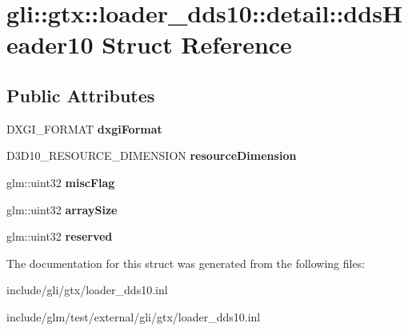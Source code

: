 \hypertarget{structgli_1_1gtx_1_1loader__dds10_1_1detail_1_1ddsHeader10}{\section{gli\-:\-:gtx\-:\-:loader\-\_\-dds10\-:\-:detail\-:\-:dds\-Header10 \-Struct \-Reference}
\label{structgli_1_1gtx_1_1loader__dds10_1_1detail_1_1ddsHeader10}
}
\subsection*{\-Public \-Attributes}
\begin{DoxyCompactItemize}
\item 
\hypertarget{structgli_1_1gtx_1_1loader__dds10_1_1detail_1_1ddsHeader10_a6755b770b7f2f2b893ab67de4f99a265}{\-D\-X\-G\-I\-\_\-\-F\-O\-R\-M\-A\-T {\bfseries dxgi\-Format}}\label{structgli_1_1gtx_1_1loader__dds10_1_1detail_1_1ddsHeader10_a6755b770b7f2f2b893ab67de4f99a265}

\item 
\hypertarget{structgli_1_1gtx_1_1loader__dds10_1_1detail_1_1ddsHeader10_aabfa6378c5788631a1e61ee683d82279}{\-D3\-D10\-\_\-\-R\-E\-S\-O\-U\-R\-C\-E\-\_\-\-D\-I\-M\-E\-N\-S\-I\-O\-N {\bfseries resource\-Dimension}}\label{structgli_1_1gtx_1_1loader__dds10_1_1detail_1_1ddsHeader10_aabfa6378c5788631a1e61ee683d82279}

\item 
\hypertarget{structgli_1_1gtx_1_1loader__dds10_1_1detail_1_1ddsHeader10_a6c7c7b3eeddd6bf451372b46b8a62c58}{glm\-::uint32 {\bfseries misc\-Flag}}\label{structgli_1_1gtx_1_1loader__dds10_1_1detail_1_1ddsHeader10_a6c7c7b3eeddd6bf451372b46b8a62c58}

\item 
\hypertarget{structgli_1_1gtx_1_1loader__dds10_1_1detail_1_1ddsHeader10_a023efbcb6da141053c6ae0e6783d304e}{glm\-::uint32 {\bfseries array\-Size}}\label{structgli_1_1gtx_1_1loader__dds10_1_1detail_1_1ddsHeader10_a023efbcb6da141053c6ae0e6783d304e}

\item 
\hypertarget{structgli_1_1gtx_1_1loader__dds10_1_1detail_1_1ddsHeader10_a3944ba1d8e6d207988806938824277af}{glm\-::uint32 {\bfseries reserved}}\label{structgli_1_1gtx_1_1loader__dds10_1_1detail_1_1ddsHeader10_a3944ba1d8e6d207988806938824277af}

\end{DoxyCompactItemize}


\-The documentation for this struct was generated from the following files\-:\begin{DoxyCompactItemize}
\item 
include/gli/gtx/loader\-\_\-dds10.\-inl\item 
include/glm/test/external/gli/gtx/loader\-\_\-dds10.\-inl\end{DoxyCompactItemize}
